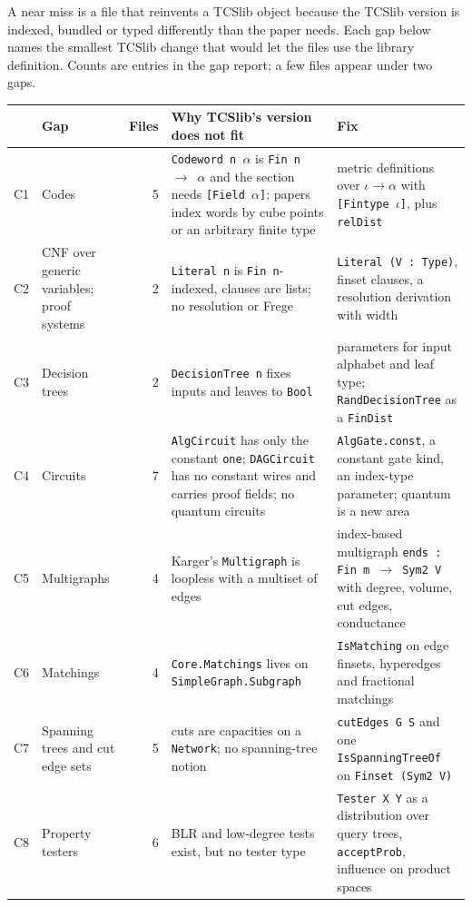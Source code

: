 \documentclass[11pt]{article}
\newcommand{\code}[1]{\texttt{#1}}
\begin{document}
A near miss is a file that reinvents a TCSlib object because the TCSlib version is indexed,
bundled or typed differently than the paper needs. Each gap below names the smallest TCSlib
change that would let the files use the library definition. Counts are entries in the gap report;
a few files appear under two gaps.

\begin{center}
\small
\begin{tabular}{@{}R{0.5cm}R{4.3cm}rR{5.3cm}R{4.3cm}@{}}
\toprule
 & Gap & Files & Why TCSlib's version does not fit & Fix \\
\midrule
C1 & Codes & 5 & \code{Codeword n $\alpha$} is \code{Fin n $\to$ $\alpha$} and the section needs \code{[Field $\alpha$]}; papers index words by cube points or an arbitrary finite type & metric definitions over \code{$\iota \to \alpha$} with \code{[Fintype $\iota$]}, plus \code{relDist} \\
C2 & CNF over generic variables; proof systems & 2 & \code{Literal n} is \code{Fin n}-indexed, clauses are lists; no resolution or Frege & \code{Literal (V : Type)}, finset clauses, a resolution derivation with width \\
C3 & Decision trees & 2 & \code{DecisionTree n} fixes inputs and leaves to \code{Bool} & parameters for input alphabet and leaf type; \code{RandDecisionTree} as a \code{FinDist} \\
C4 & Circuits & 7 & \code{AlgCircuit} has only the constant \code{one}; \code{DAGCircuit} has no constant wires and carries proof fields; no quantum circuits & \code{AlgGate.const}, a constant gate kind, an index-type parameter; quantum is a new area \\
C5 & Multigraphs & 4 & Karger's \code{Multigraph} is loopless with a multiset of edges & index-based multigraph \code{ends : Fin m $\to$ Sym2 V} with degree, volume, cut edges, conductance \\
C6 & Matchings & 4 & \code{Core.Matchings} lives on \code{SimpleGraph.Subgraph} & \code{IsMatching} on edge finsets, hyperedges and fractional matchings \\
C7 & Spanning trees and cut edge sets & 5 & cuts are capacities on a \code{Network}; no spanning-tree notion & \code{cutEdges G S} and one \code{IsSpanningTreeOf} on \code{Finset (Sym2 V)} \\
C8 & Property testers & 6 & BLR and low-degree tests exist, but no tester type & \code{Tester X Y} as a distribution over query trees, \code{acceptProb}, influence on product spaces \\

\end{tabular}
\end{center}
\end{document}
